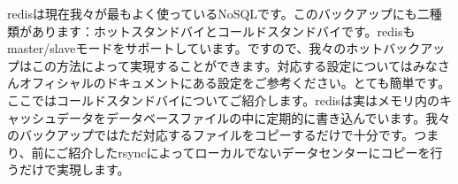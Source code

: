 redisは現在我々が最もよく使っているNoSQLです。このバックアップにも二種類があります：ホットスタンドバイとコールドスタンドバイです。redisもmaster/slaveモードをサポートしています。ですので、我々のホットバックアップはこの方法によって実現することができます。対応する設定についてはみなさんオフィシャルのドキュメントにある設定をご参考ください。とても簡単です。ここではコールドスタンドバイについてご紹介します。redisは実はメモリ内のキャッシュデータをデータベースファイルの中に定期的に書き込んでいます。我々のバックアップではただ対応するファイルをコピーするだけで十分です。つまり、前にご紹介したrsyncによってローカルでないデータセンターにコピーを行うだけで実現します。
